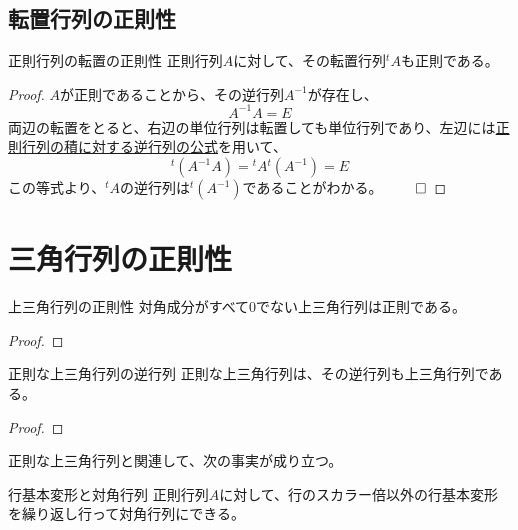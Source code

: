 \documentclass[../../../topic_linear-algebra]{subfiles}
\begin{document}
\subsection{転置行列の正則性}

\begin{theorem}{正則行列の転置の正則性}\label{thm:transpose-of-invertible}
  正則行列$A$に対して、その転置行列${}^t A$も正則である。
\end{theorem}

\begin{proof}
  $A$が正則であることから、その逆行列$A^{-1}$が存在し、
  \begin{equation*}
    A^{-1}A = E
  \end{equation*}
  両辺の転置をとると、右辺の単位行列は転置しても単位行列であり、左辺には\hyperref[thm:inverse-of-product]{正則行列の積に対する逆行列の公式}を用いて、
  \begin{equation*}
    {}^t(A^{-1}A) = {}^t A {}^t (A^{-1}) = E
  \end{equation*}
  この等式より、${}^t A$の逆行列は${}^t (A^{-1})$であることがわかる。 $\qed$
\end{proof}

\sectionline
\section{三角行列の正則性}

\begin{theorem}{上三角行列の正則性}
  対角成分がすべて0でない上三角行列は正則である。
\end{theorem}

\begin{proof}
\end{proof}

\br

\begin{theorem}{正則な上三角行列の逆行列}\label{thm:inverse-of-upper-triangular}
  正則な上三角行列は、その逆行列も上三角行列である。
\end{theorem}

\begin{proof}
  \todo{}
\end{proof}

\br

正則な上三角行列と関連して、次の事実が成り立つ。

\begin{theorem}{行基本変形と対角行列}
  正則行列$A$に対して、行のスカラー倍以外の行基本変形を繰り返し行って対角行列にできる。
\end{theorem}
\end{document}
